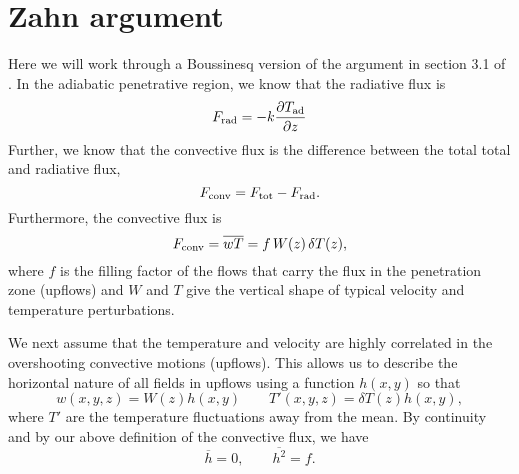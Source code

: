 \documentclass[12pt]{article}
\begin{document}
\section{Zahn argument}
Here we will work through a Boussinesq version of the argument in section 3.1 of \citet{zahn1991}.
In the adiabatic penetrative region, we know that the radiative flux is
\begin{equation}
F_{\rm{rad}} = -k \frac{\partial T_{\rm{ad}}}{\partial z}
\end{equation}
Further, we know that the convective flux is the difference between the total total and radiative flux,
\begin{equation}
F_{\rm{conv}} = F_{\rm{tot}} - F_{\rm{rad}}.
\end{equation}
Furthermore, the convective flux is
\begin{equation}
F_{\rm{conv}} = \overline{w T} = f \, W(z) \, \delta T(z),
\end{equation}
where $f$ is the filling factor of the flows that carry the flux in the penetration zone (upflows) and $W$ and $T$ give the vertical shape of typical velocity and temperature perturbations.

We next assume that the temperature and velocity are highly correlated in the overshooting convective motions (upflows).
This allows us to describe the horizontal nature of all fields in upflows using a function $h(x,y)$ so that
\begin{equation}
w(x,y,z) = W(z) h(x,y)
\qquad
T'(x,y,z) = \delta T(z) h(x,y),
\end{equation}
where $T'$ are the temperature fluctuations away from the mean.
By continuity and by our above definition of the convective flux, we have
\begin{equation}
\overline{h} = 0,
\qquad
\overline{h^2} = f.
\end{equation}




\end{document}
